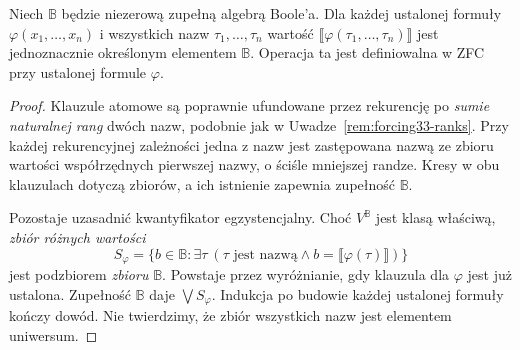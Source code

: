\begin{lemat}
\label{lem:boolean35-well-defined}
Niech $\mathbb B$ będzie niezerową
zupełną algebrą Boole'a.
Dla każdej ustalonej formuły
$\varphi(x_1,\ldots,x_n)$ i wszystkich
nazw $\tau_1,\ldots,\tau_n$
wartość $\llbracket
\varphi(\tau_1,\ldots,\tau_n)\rrbracket$
jest jednoznacznie określonym
elementem $\mathbb B$. Operacja ta
jest definiowalna w ZFC przy
ustalonej formule $\varphi$.
\end{lemat}
\begin{proof}
Klauzule atomowe są poprawnie
ufundowane przez rekurencję
po \emph{sumie naturalnej rang}
dwóch nazw, podobnie jak w
Uwadze~\ref{rem:forcing33-ranks}.
Przy każdej rekurencyjnej zależności
jedna z nazw jest zastępowana nazwą
ze zbioru wartości współrzędnych
pierwszej nazwy, o ściśle mniejszej
randze. Kresy w obu klauzulach
dotyczą zbiorów, a ich istnienie
zapewnia zupełność $\mathbb B$.

Pozostaje uzasadnić kwantyfikator
egzystencjalny. Choć
$V^{\mathbb B}$ jest klasą właściwą,
\emph{zbiór różnych wartości}
\[
 S_\varphi=\{b\in\mathbb B:
      \exists\tau\ (\tau\text{ jest nazwą}
        \land b=\llbracket\varphi(\tau)\rrbracket)\}
\]
jest podzbiorem \emph{zbioru}
$\mathbb B$. Powstaje przez
wyróżnianie, gdy klauzula dla
$\varphi$ jest już ustalona.
Zupełność $\mathbb B$ daje
$\bigvee S_\varphi$.
Indukcja po budowie każdej
ustalonej formuły kończy dowód.
Nie twierdzimy, że zbiór
wszystkich nazw jest elementem
uniwersum.
\end{proof}

